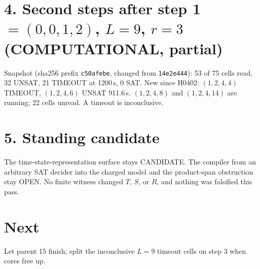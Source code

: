 \documentclass[11pt]{article}
\begin{document}
\section*{4. Second steps after step 1 $=(0,0,1,2)$, $L=9$, $r=3$ (COMPUTATIONAL, partial)}
Snapshot  (sha256 prefix \texttt{c50afebe}, changed from \texttt{14e2e444}): 53 of 75 cells read, 32 UNSAT, 21 TIMEOUT at 1200\,s, 0 SAT. New since H0402: $(1,2,4,4)$ TIMEOUT, $(1,2,4,6)$ UNSAT 911.6\,s. $(1,2,4,8)$ and $(1,2,4,14)$ are running; 22 cells unread. A timeout is inconclusive.

\section*{5. Standing candidate}
The time-state-representation surface stays CANDIDATE. The compiler from an arbitrary SAT decider into the charged model and the product-span obstruction stay OPEN. No finite witness changed $T$, $S$, or $R$, and nothing was falsified this pass.

\section*{Next}
Let parent 15 finish; split the inconclusive $L=9$ timeout cells on step 3 when cores free up.
\end{document}
